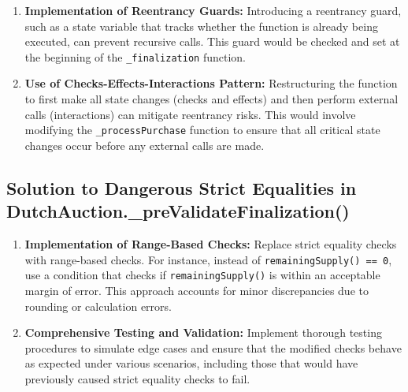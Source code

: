 \documentclass[conference]{IEEEtran}
\begin{document}
\begin{enumerate}
    \item \textbf{Implementation of Reentrancy Guards:} Introducing a reentrancy guard, such as a state variable that tracks whether the function is already being executed, can prevent recursive calls. This guard would be checked and set at the beginning of the \texttt{\_finalization} function.
    
    \item \textbf{Use of Checks-Effects-Interactions Pattern:} Restructuring the function to first make all state changes (checks and effects) and then perform external calls (interactions) can mitigate reentrancy risks. This would involve modifying the \texttt{\_processPurchase} function to ensure that all critical state changes occur before any external calls are made.
\end{enumerate}

\subsection{Solution to Dangerous Strict Equalities in DutchAuction.\_preValidateFinalization()}

\begin{enumerate}
    \item \textbf{Implementation of Range-Based Checks:} Replace strict equality checks with range-based checks. For instance, instead of \texttt{remainingSupply() == 0}, use a condition that checks if \texttt{remainingSupply()} is within an acceptable margin of error. This approach accounts for minor discrepancies due to rounding or calculation errors.
    
    \item \textbf{Comprehensive Testing and Validation:} Implement thorough testing procedures to simulate edge cases and ensure that the modified checks behave as expected under various scenarios, including those that would have previously caused strict equality checks to fail.
\end{enumerate}
\end{document}

